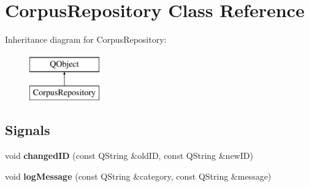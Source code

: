 \hypertarget{class_corpus_repository}{}\section{Corpus\+Repository Class Reference}
\label{class_corpus_repository}
Inheritance diagram for Corpus\+Repository\+:\begin{figure}[H]
\begin{center}
\leavevmode
\includegraphics[height=2.000000cm]{class_corpus_repository}
\end{center}
\end{figure}
\subsection*{Signals}
\begin{DoxyCompactItemize}
\item 
\mbox{\label{class_corpus_repository_a73d1198545d4557409620c1c361691bd}} 
void {\bfseries changed\+ID} (const Q\+String \&old\+ID, const Q\+String \&new\+ID)
\item 
\mbox{\label{class_corpus_repository_a46dca05e48d3b11613add7f8d18896c7}} 
void {\bfseries log\+Message} (const Q\+String \&category, const Q\+String \&message)
\end{DoxyCompactItemize}
